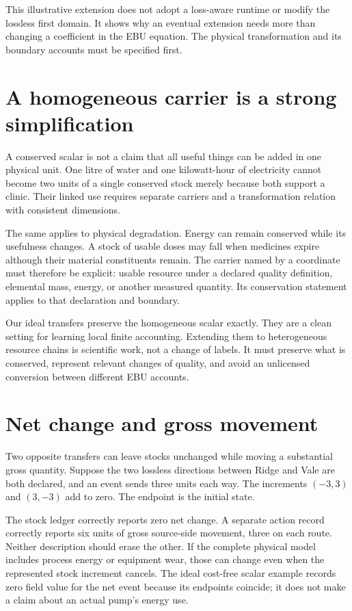This illustrative extension does not adopt a loss-aware runtime or modify the lossless first domain. It shows why an eventual extension needs more than changing a coefficient in the EBU equation. The physical transformation and its boundary accounts must be specified first.

\section{A homogeneous carrier is a strong simplification}
A conserved scalar is not a claim that all useful things can be added in one physical unit. One litre of water and one kilowatt-hour of electricity cannot become two units of a single conserved stock merely because both support a clinic. Their linked use requires separate carriers and a transformation relation with consistent dimensions.

The same applies to physical degradation. Energy can remain conserved while its usefulness changes. A stock of usable doses may fall when medicines expire although their material constituents remain. The carrier named by a coordinate must therefore be explicit: usable resource under a declared quality definition, elemental mass, energy, or another measured quantity. Its conservation statement applies to that declaration and boundary.

Our ideal transfers preserve the homogeneous scalar exactly. They are a clean setting for learning local finite accounting. Extending them to heterogeneous resource chains is scientific work, not a change of labels. It must preserve what is conserved, represent relevant changes of quality, and avoid an unlicensed conversion between different EBU accounts.

\section{Net change and gross movement}
Two opposite transfers can leave stocks unchanged while moving a substantial gross quantity. Suppose the two lossless directions between Ridge and Vale are both declared, and an event sends three units each way. The increments \((-3,3)\) and \((3,-3)\) add to zero. The endpoint is the initial state.

The stock ledger correctly reports zero net change. A separate action record correctly reports six units of gross source-side movement, three on each route. Neither description should erase the other. If the complete physical model includes process energy or equipment wear, those can change even when the represented stock increment cancels. The ideal cost-free scalar example records zero field value for the net event because its endpoints coincide; it does not make a claim about an actual pump's energy use.

